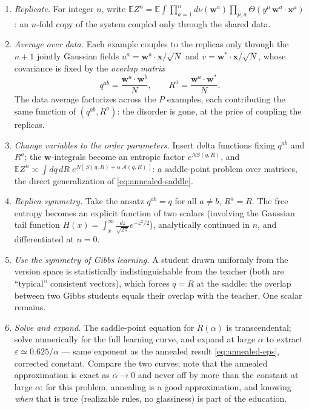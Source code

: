 \documentclass[11pt]{article}
\newcommand{\E}{\mathbb{E}}
\newcommand{\bv}[1]{\boldsymbol{#1}}
\begin{document}
\begin{enumerate}
  \item \emph{Replicate.} For integer $n$, write $\E Z^n = \E \int
  \prod_{a=1}^{n} d\nu(\bv{w}^a) \prod_{\mu, a}
  \Theta(y^\mu\, \bv{w}^a \cdot \bv{x}^\mu)$: an $n$-fold copy of the
  system coupled only through the shared data.
  \item \emph{Average over data.} Each example couples to the replicas only
  through the $n+1$ jointly Gaussian fields $u^a = \bv{w}^a\cdot\bv{x}/
  \sqrt N$ and $v = \bv{w}^*\cdot\bv{x}/\sqrt N$, whose covariance is
  fixed by the \emph{overlap matrix}
  \begin{equation}
    q^{ab} = \frac{\bv{w}^a \cdot \bv{w}^b}{N},
    \qquad
    R^a = \frac{\bv{w}^a \cdot \bv{w}^*}{N}.
  \end{equation}
  The data average factorizes across the $P$ examples, each contributing
  the same function of $(q^{ab}, R^a)$: the disorder is gone, at the price
  of coupling the replicas.
  \item \emph{Change variables to the order parameters.} Insert delta
  functions fixing $q^{ab}$ and $R^a$; the $\bv{w}$-integrals become an
  entropic factor $e^{N S(q, R)}$, and $\E Z^n \asymp \int dq\, dR\;
  e^{N[\,S(q,R) + \alpha\, \mathcal{A}(q,R)\,]}$: a saddle-point problem
  over matrices, the direct generalization of \cref{eq:annealed-saddle}.
  \item \emph{Replica symmetry.} Take the ansatz $q^{ab} = q$ for all
  $a \neq b$, $R^a = R$. The free entropy becomes an explicit function of
  two scalars (involving the Gaussian tail function
  $H(x) = \int_x^\infty \frac{dz}{\sqrt{2\pi}} e^{-z^2/2}$), analytically
  continued in $n$, and differentiated at $n = 0$.
  \item \emph{Use the symmetry of Gibbs learning.} A student drawn
  uniformly from the version space is statistically indistinguishable from
  the teacher (both are ``typical'' consistent vectors), which forces
  $q = R$ at the saddle: the overlap between two Gibbs students equals
  their overlap with the teacher. One scalar remains.
  \item \emph{Solve and expand.} The saddle-point equation for $R(\alpha)$
  is transcendental; solve numerically for the full learning curve, and
  expand at large $\alpha$ to extract $\varepsilon \simeq 0.625/\alpha$
  --- same exponent as the annealed result \cref{eq:annealed-eps},
  corrected constant. Compare the two curves; note that the annealed
  approximation is exact as $\alpha \to 0$ and never off by more than the
  constant at large $\alpha$: for this problem, annealing is a good
  approximation, and knowing \emph{when} that is true (realizable rules,
  no glassiness) is part of the education.
\end{enumerate}
\end{document}
